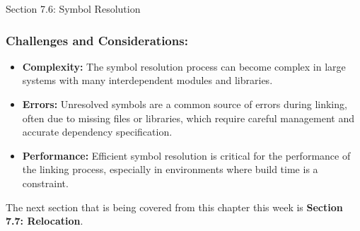\begin{notes}{Section 7.6: Symbol Resolution}
    \subsubsection*{Challenges and Considerations:}
    
    \begin{itemize}
        \item \textbf{Complexity:} The symbol resolution process can become complex in large systems with many interdependent modules and libraries.
        \item \textbf{Errors:} Unresolved symbols are a common source of errors during linking, often due to missing files or libraries, which require careful management and accurate dependency specification.
        \item \textbf{Performance:} Efficient symbol resolution is critical for the performance of the linking process, especially in environments where build time is a constraint.
    \end{itemize}    
\end{notes}

The next section that is being covered from this chapter this week is \textbf{Section 7.7: Relocation}.

